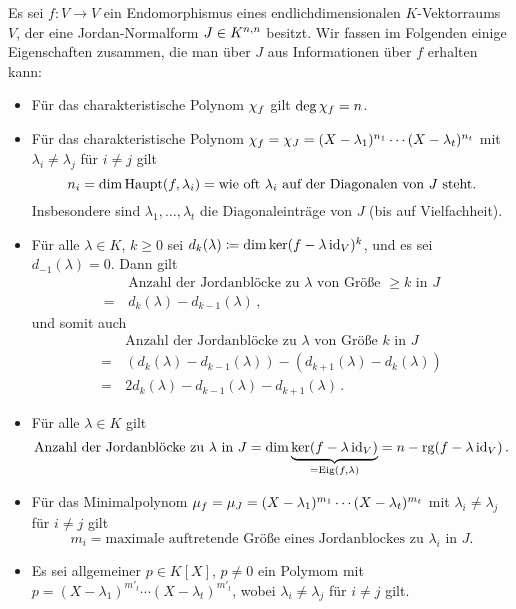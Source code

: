 \documentclass[a4paper,10pt,numbers = noenddot]{scrartcl}
\begin{document}
Es sei $f \colon V \to V$ ein Endomorphismus eines endlichdimensionalen $K$-Vektorraums $V$, der eine Jordan-Normalform $J \in \matrices{n}{K}$ besitzt.
Wir fassen im Folgenden einige Eigenschaften zusammen, die man über $J$ aus Informationen über $f$ erhalten kann:
\begin{itemize}
  \item
    Für das charakteristische Polynom $\charpol{f}$ gilt $\deg \charpol{f} = n$.
  \item
    Für das charakteristische Polynom $\charpol{f} = \charpol{J} = (X - \lambda_1)^{n_1} \dotsm (X - \lambda_t)^{n_t}$ mit $\lambda_i \neq \lambda_j$ für $i \neq j$ gilt
    \[
        n_i
      = \dim \hauptspace{f}{\lambda_i}
      = \text{wie oft $\lambda_i$ auf der Diagonalen von $J$ steht}.
    \]
    Insbesondere sind $\lambda_1, \dotsc, \lambda_t$ die Diagonaleinträge von $J$ (bis auf Vielfachheit).
  \item
    Für alle $\lambda \in K$, $k \geq 0$ sei $d_k(\lambda) \defined \dim \ker(f - \lambda \id_V)^k$, und es sei $d_{-1}(\lambda) = 0$.
    Dann gilt
    \begin{align*}
       &\,   \text{Anzahl der Jordanblöcke zu $\lambda$ von Größe $\geq k$ in $J$} \\
      =&\,  d_k(\lambda) - d_{k-1}(\lambda) \,,
    \end{align*}
    und somit auch
    \begin{align*}
       &\,  \text{Anzahl der Jordanblöcke zu $\lambda$ von Größe $k$ in $J$} \\
      =&\,  ( d_k(\lambda) - d_{k-1}(\lambda) ) - (d_{k+1}(\lambda) - d_k(\lambda) )  \\
      =&\,  2 d_k(\lambda) - d_{k-1}(\lambda) - d_{k+1}(\lambda) \,.
    \end{align*}
  \item
    Für alle $\lambda \in K$ gilt
    \[
        \text{Anzahl der Jordanblöcke zu $\lambda$ in $J$}
      = \dim \underbrace{ \ker (f - \lambda \id_V) }_{= \eigenspace{f}{\lambda}}
      = n - \rank (f - \lambda \id_V) \,.
    \]
  \item
    Für das Minimalpolynom $\minpol{f} = \minpol{J} = (X - \lambda_1)^{m_1} \dotsm (X - \lambda_t)^{m_t}$ mit $\lambda_i \neq \lambda_j$ für $i \neq j$ gilt
    \[
        m_i
      = \text{maximale auftretende Größe eines Jordanblockes zu $\lambda_i$ in $J$}.
    \]
  \item
    Es sei allgemeiner $p \in K[X]$, $p \neq 0$ ein Polymom mit $p = (X - \lambda_1)^{m'_t} \dotsm (X - \lambda_t)^{m'_t}$, wobei $\lambda_i \neq \lambda_j$ für $i \neq j$ gilt.

\end{itemize}
\end{document}
